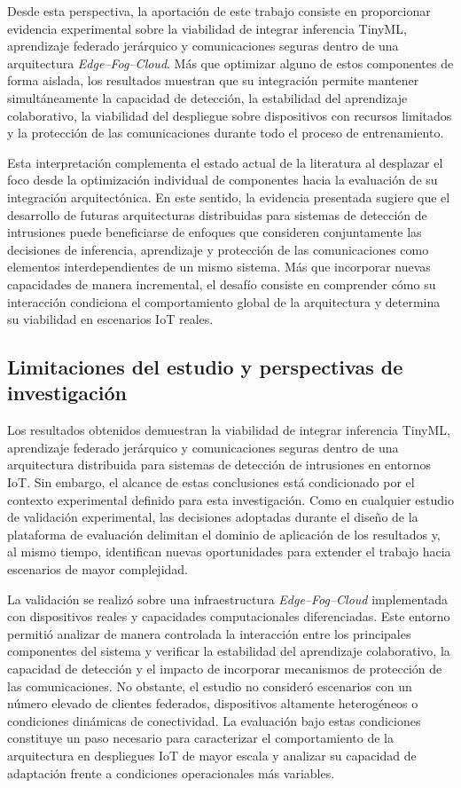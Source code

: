 \documentclass[journal,article,submit,moreauthors]{Definitions/mdpi}
\begin{document}
Desde esta perspectiva, la aportación de este trabajo consiste en proporcionar evidencia experimental sobre la viabilidad de integrar inferencia TinyML, aprendizaje federado jerárquico y comunicaciones seguras dentro de una arquitectura \textit{Edge--Fog--Cloud}. Más que optimizar alguno de estos componentes de forma aislada, los resultados muestran que su integración permite mantener simultáneamente la capacidad de detección, la estabilidad del aprendizaje colaborativo, la viabilidad del despliegue sobre dispositivos con recursos limitados y la protección de las comunicaciones durante todo el proceso de entrenamiento.

Esta interpretación complementa el estado actual de la literatura al desplazar el foco desde la optimización individual de componentes hacia la evaluación de su integración arquitectónica. En este sentido, la evidencia presentada sugiere que el desarrollo de futuras arquitecturas distribuidas para sistemas de detección de intrusiones puede beneficiarse de enfoques que consideren conjuntamente las decisiones de inferencia, aprendizaje y protección de las comunicaciones como elementos interdependientes de un mismo sistema. Más que incorporar nuevas capacidades de manera incremental, el desafío consiste en comprender cómo su interacción condiciona el comportamiento global de la arquitectura y determina su viabilidad en escenarios IoT reales.

\subsection{Limitaciones del estudio y perspectivas de investigación}
Los resultados obtenidos demuestran la viabilidad de integrar inferencia TinyML, aprendizaje federado jerárquico y comunicaciones seguras dentro de una arquitectura distribuida para sistemas de detección de intrusiones en entornos IoT. Sin embargo, el alcance de estas conclusiones está condicionado por el contexto experimental definido para esta investigación. Como en cualquier estudio de validación experimental, las decisiones adoptadas durante el diseño de la plataforma de evaluación delimitan el dominio de aplicación de los resultados y, al mismo tiempo, identifican nuevas oportunidades para extender el trabajo hacia escenarios de mayor complejidad.

La validación se realizó sobre una infraestructura \textit{Edge--Fog--Cloud} implementada con dispositivos reales y capacidades computacionales diferenciadas. Este entorno permitió analizar de manera controlada la interacción entre los principales componentes del sistema y verificar la estabilidad del aprendizaje colaborativo, la capacidad de detección y el impacto de incorporar mecanismos de protección de las comunicaciones. No obstante, el estudio no consideró escenarios con un número elevado de clientes federados, dispositivos altamente heterogéneos o condiciones dinámicas de conectividad. La evaluación bajo estas condiciones constituye un paso necesario para caracterizar el comportamiento de la arquitectura en despliegues IoT de mayor escala y analizar su capacidad de adaptación frente a condiciones operacionales más variables.
\end{document}
